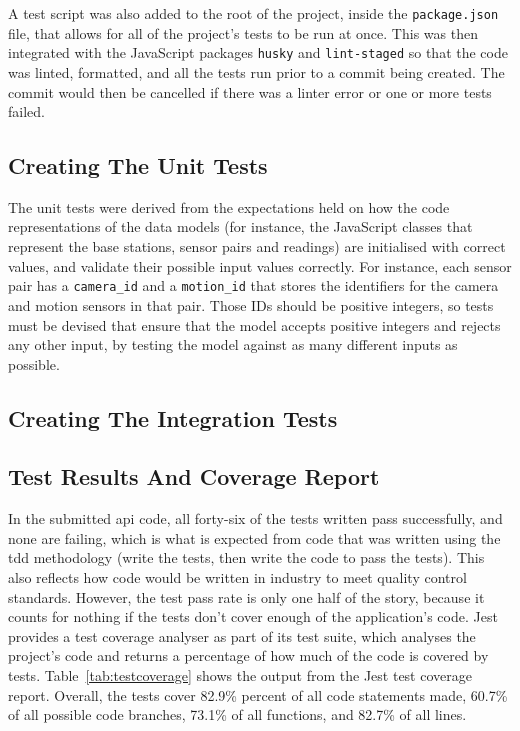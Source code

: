 A test script was also added to the root of the project, inside the
\texttt{package.json} file, that allows for all of the project's tests to be
run at once. This was then integrated with the JavaScript packages
\texttt{husky} and \texttt{lint-staged} so that the code was linted,
formatted, and all the tests run prior to a commit being created. The commit
would then be cancelled if there was a linter error or one or more tests failed.

\subsection{Creating The Unit Tests}
The unit tests were derived from the expectations held on how the code
representations of the data models (for instance, the JavaScript classes that
represent the base stations, sensor pairs and readings) are initialised with
correct values, and validate their possible input values correctly. For
instance, each sensor pair has a \texttt{camera\_id} and a
\texttt{motion\_id} that stores the identifiers for the camera and motion
sensors in that pair. Those IDs should be positive integers, so tests must be
devised that ensure that the model accepts positive integers and rejects any
other input, by testing the model against as many different inputs as
possible.

\subsection{Creating The Integration Tests}

\subsection{Test Results And Coverage Report}

In the submitted \acrshort{api} code, all forty-six of the tests written pass
successfully, and none are failing, which is what is expected from code that
was written using the \acrfull{tdd} methodology (write the tests, then write
the code to pass the tests). This also reflects how code would be written in
industry to meet quality control standards. However, the test pass rate is
only one half of the story, because it counts for nothing if the tests don't
cover enough of the application's code. Jest provides a test coverage
analyser as part of its test suite, which analyses the project's code and
returns a percentage of how much of the code is covered by tests.
Table~\ref{tab:testcoverage} shows the output from the Jest test coverage
report. Overall, the tests cover 82.9\% percent of all code statements made,
60.7\% of all possible code branches, 73.1\% of all functions, and 82.7\% of
all lines.

